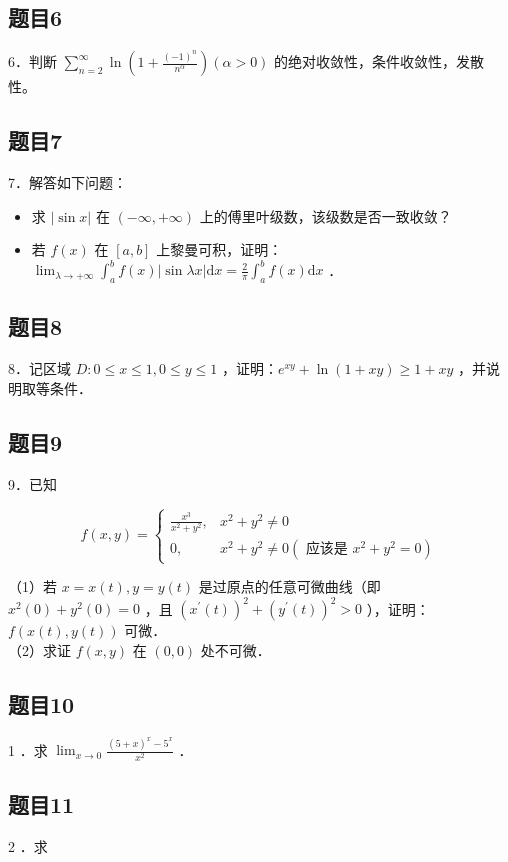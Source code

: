 \documentclass{article}
\begin{document}
\subsection{题目6}
6．判断 \(\sum_{n=2}^{\infty} \ln \left(1+\frac{(-1)^{n}}{n^{\alpha}}\right)(\alpha>0)\) 的绝对收敛性，条件收敛性，发散性。

\subsection{题目7}
7．解答如下问题：

\begin{itemize}
  \item[（1）] 求 \(|\sin x|\) 在 \((-\infty,+\infty)\) 上的傅里叶级数，该级数是否一致收敛？
  \item[（2）] 若 \(f(x)\) 在 \([a, b]\) 上黎曼可积，证明： \(\lim _{\lambda \rightarrow+\infty} \int_{a}^{b} f(x)|\sin \lambda x| \mathrm{d} x=\frac{2}{\pi} \int_{a}^{b} f(x) \mathrm{d} x\) ．
\end{itemize}

\subsection{题目8}
8．记区域 \(D: 0 \leq x \leq 1,0 \leq y \leq 1\) ，证明：\(e^{x y}+\ln (1+x y) \geq 1+x y\) ，并说明取等条件．

\subsection{题目9}
9．已知

\[
f(x, y)= \begin{cases}\frac{x^{3}}{x^{2}+y^{2}}, & x^{2}+y^{2} \neq 0 \\ 0, & x^{2}+y^{2} \neq 0\left(\text { 应该是 } x^{2}+y^{2}=0\right)\end{cases}
\]

（1）若 \(x=x(t), y=y(t)\) 是过原点的任意可微曲线（即 \(x^{2}(0)+y^{2}(0)=0\) ，且 \(\left(x^{\prime}(t)\right)^{2}+\left(y^{\prime}(t)\right)^{2}>0\) ），证明：\(f(x(t), y(t))\) 可微．\\
（2）求证 \(f(x, y)\) 在 \((0,0)\) 处不可微．

\subsection{题目10}
1 ．求 \(\lim _{x \rightarrow 0} \frac{(5+x)^{x}-5^{x}}{x^{2}}\) ．

\subsection{题目11}
2 ．求
\end{document}

